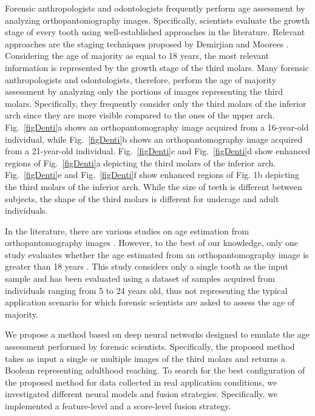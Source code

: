 \documentclass[conference]{IEEEtran}
\begin{document}
Forensic anthropologists and odontologists frequently perform age assessment by analyzing orthopantomography images. Specifically, scientists evaluate the growth stage of every tooth using well-established approaches in the literature. Relevant approaches are the staging techniques proposed by Demirjian \cite{Demirjian} and Moorees \cite{Moorees}. Considering the age of majority as equal to 18 years, the most relevant information is represented by the growth stage of the third molars. Many forensic anthropologists and odontologists, therefore, perform the age of majority assessment by analyzing only the portions of images representing the third molars. Specifically, they frequently consider only the third molars of the inferior arch since they are more visible compared to the ones of the upper arch. Fig.~\ref{figDenti}a shows an orthopantomography image acquired from a 16-year-old individual, while Fig.~\ref{figDenti}b shows an orthopantomography image acquired from a 21-year-old individual. Fig.~\ref{figDenti}c and Fig.~\ref{figDenti}d show enhanced regions of Fig.~\ref{figDenti}a depicting the third molars of the inferior arch. Fig.~\ref{figDenti}e and Fig.~\ref{figDenti}f show enhanced regions of Fig. 1b depicting the third molars of the inferior arch. While the size of teeth is different between subjects, the shape of the third molars is different for underage and adult individuals.

In the literature, there are various studies on age estimation from orthopantomography images \cite{survey}. However, to the best of our knowledge, only one study evaluates whether the age estimated from an orthopantomography image is greater than 18 years \cite{PMID33661340}. This study considers only a single tooth as the input sample and has been evaluated using a dataset of samples acquired from individuals ranging from 5 to 24 years old, thus not representing the typical application scenario for which forensic scientists are asked to assess the age of majority.

We propose a method based on deep neural networks designed to emulate the age assessment performed by forensic scientists. Specifically, the proposed method takes as input a single or multiple images of the third molars and returns a Boolean representing adulthood reaching. To search for the best configuration of the proposed method for data collected in real application conditions, we investigated different neural models and fusion strategies. Specifically, we implemented a feature-level and a score-level fusion strategy.
\end{document}
